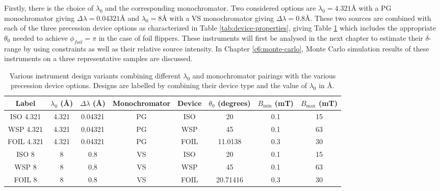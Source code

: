 \documentclass{article}
\begin{document}
Firstly, there is the choice of $\lambda_0$ and the corresponding monochromator. Two considered options are $\lambda_0 = 4.321$Å with a PG monochromator giving $\Delta\lambda = 0.04321$Å and $\lambda_0 = 8$Å with a VS monochromator giving $\Delta\lambda = 0.8$Å. These two sources are combined with each of the three precession device options as characterized in Table \ref{tab:device-properties}, giving Table \ref{tab:design-variants} which includes the appropriate $\theta_0$ needed to achieve $\phi_{foil} = \pi$ in the case of foil flippers. These instruments will first be analysed in the next chapter to estimate their $\delta$-range by using constraints as well as their relative source intensity. In Chapter \ref{c6:monte-carlo}, Monte Carlo simulation results of these instruments on a three representative samples are discussed. 

\begin{table}[h!]
	\centering
	\begin{tabular}{|c|c|c|c|c|c|c|c|}
		\hline
		Label & $\lambda_0$ (Å) & $\Delta\lambda$ (Å) & Monochromator & Device & $\theta_0$ (degrees) & $B_{\text{min}}$ (mT) & $B_{\text{max}}$ (mT) \\
		\hline
		ISO 4.321 & 4.321 & 0.04321 & PG & ISO & 20 & 0.1 & 15 \\
		WSP 4.321 & 4.321 & 0.04321 & PG & WSP & 45 & 0.1 & 63 \\
		FOIL 4.321 & 4.321 & 0.04321 & PG & FOIL & 11.0138 & 0.3 & 30 \\
		ISO 8 & 8 & 0.8 & VS & ISO & 20 & 0.1 & 15 \\
		WSP 8 & 8 & 0.8 & VS & WSP & 45 & 0.1 & 63 \\
		FOIL 8 & 8 & 0.8 & VS & FOIL & 20.71416 & 0.3 & 30 \\
		\hline
	\end{tabular}
	\caption{Various instrument design variants combining different $\lambda_0$ and monochromator pairings with the various precession device options. Designs are labelled by combining their device type and the value of $\lambda_0$ in Å.}
	\label{tab:design-variants}
\end{table}




\end{document}
